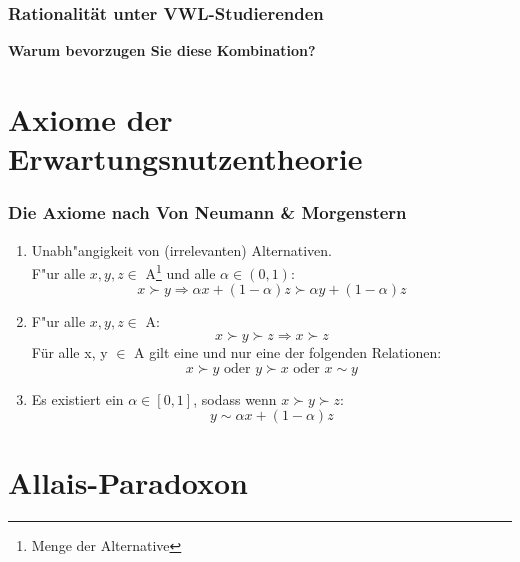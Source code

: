 \documentclass{beamer}
\begin{document}
 \begin{frame}
   \frametitle{Rationalit\"at unter VWL-Studierenden}
   \begin{center}
     

   \huge{\textbf{Warum bevorzugen Sie diese Kombination?}}
   \end{center}
 \end{frame}

\section{Axiome der Erwartungsnutzentheorie}
\label{sec:einfuhrung}
\begin{frame}
  \frametitle{Die Axiome nach Von Neumann \& Morgenstern}
   \begin{enumerate}
  \item<1,4> Unabh"angigkeit von (irrelevanten) Alternativen.\\
    F"ur alle $x, y, z \in$ A\footnote{Menge der Alternative} und alle $\alpha \in (0,1)$:\\
    \begin{equation}
      \label{eq:4}
      x \succ y \Rightarrow \alpha x +(1-\alpha) z \succ \alpha y + (1-\alpha) z  \tag{Unabh"angigkeit}
    \end{equation}

        
  \item<2> F"ur alle $x, y, z \in$ A:
      \begin{equation}
      \label{eq:1}
     x \succ y \succ z \Rightarrow x \succ z \tag{Transitivit"at}
    \end{equation}
    F\"ur alle x, y $\in$ A gilt eine und nur eine der folgenden Relationen:
    \begin{equation}
      \label{eq:2}
     x \succ y \text{ oder } y \succ x \text{ oder } x \sim y \tag{Vollst"andigkeit  \& Asymmetrie}
    \end{equation}
  \item<3> Es existiert ein $\alpha \in [0,1]$, sodass wenn $x \succ y \succ z$:
    \begin{equation}
      \label{eq:3}
      y \sim \alpha x + (1-\alpha) z \tag{Stetigkeit}
    \end{equation}
  \end{enumerate}

\end{frame}

\section{Allais-Paradoxon}
\end{document}
